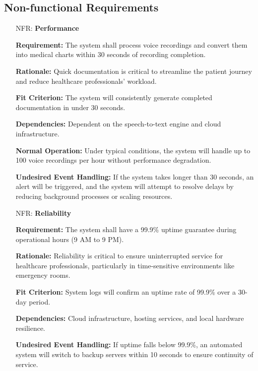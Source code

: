 \documentclass[12pt]{article}
\newcounter{nfrnum} %
\begin{document}
\subsection{Non-functional Requirements}

\noindent \begin{itemize}

\item[NFR\refstepcounter{nfrnum}\thenfrnum \label{NFR_Performance}:] \textbf{Performance}  
    
    \textbf{Requirement:} The system shall process voice recordings and convert them into medical charts within 30 seconds of recording completion.  
  
    \textbf{Rationale:} Quick documentation is critical to streamline the patient journey and reduce healthcare professionals' workload.  
  
    \textbf{Fit Criterion:} The system will consistently generate completed documentation in under 30 seconds.  
  
    \textbf{Dependencies:} Dependent on the speech-to-text engine and cloud infrastructure.  
  
    \textbf{Normal Operation:} Under typical conditions, the system will handle up to 100 voice recordings per hour without performance degradation.  
  
    \textbf{Undesired Event Handling:} If the system takes longer than 30 seconds, an alert will be triggered, and the system will attempt to resolve delays by reducing background processes or scaling resources.

\item[NFR\refstepcounter{nfrnum}\thenfrnum \label{NFR_Reliability}:] \textbf{Reliability}  

    \textbf{Requirement:} The system shall have a 99.9\% uptime guarantee during operational hours (9 AM to 9 PM).  
  
    \textbf{Rationale:} Reliability is critical to ensure uninterrupted service for healthcare professionals, particularly in time-sensitive environments like emergency rooms.  
  
    \textbf{Fit Criterion:} System logs will confirm an uptime rate of 99.9\% over a 30-day period.  
  
    \textbf{Dependencies:} Cloud infrastructure, hosting services, and local hardware resilience.  
  
    \textbf{Undesired Event Handling:} If uptime falls below 99.9\%, an automated system will switch to backup servers within 10 seconds to ensure continuity of service.


\end{itemize}
\end{document}
